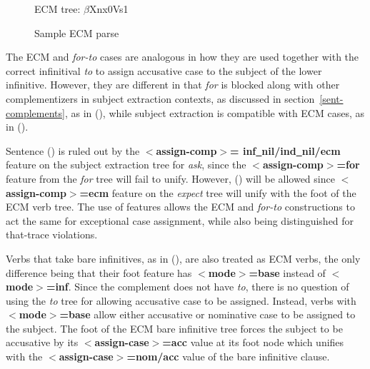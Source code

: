 \begin{figure}[hbt]
\centering
\hspace{0.0in}
\caption{ECM tree: $\beta$Xnx0Vs1}
\label{expects-decl}
\label{3;1,15}
\end{figure}

\begin{figure}[hbt]
\centering
\hspace{0.0in}
\caption{Sample ECM parse}
\label{van-expects}
\end{figure}

The ECM and {\it for-to\/} cases are analogous in how they are used together
with the correct infinitival {\it to} to assign accusative case to the 
subject of the lower infinitive.  However, they are different in that
{\it for} is blocked along with other complementizers in subject extraction
contexts, as discussed in section~\ref{sent-complements}, as in
(), while subject extraction is compatible with ECM cases, 
as in ().


Sentence () is ruled out by the {\bf $<$assign-comp$>$=
inf\underline{~}nil/ind\underline{~}nil/ecm} feature
on the subject extraction tree for {\it ask}, since the
{\bf $<$assign-comp$>$=for} feature from the {\it for} tree will fail to 
unify.  However, 
() will be allowed since {\bf $<$assign-comp$>$=ecm} feature on the
{\it expect} tree will unify with the foot of the ECM verb tree.  
The use of features allows the ECM and
{\it for-to\/} constructions to act the same for exceptional case assignment,
while also being distinguished for that-trace violations.

Verbs that take bare infinitives, as in (), are also treated as ECM
verbs, the only difference being that their foot feature has {\bf
$<$mode$>$=base} instead of {\bf $<$mode$>$=inf}.  Since the complement does
not have {\it to}, there is no question of using the {\it to} tree for allowing
accusative case to be assigned.  Instead, verbs with {\bf $<$mode$>$=base}
allow either accusative or nominative case to be assigned to the subject. The
foot of the ECM bare infinitive tree forces the subject to be accusative by its
{\bf $<$assign-case$>$=acc} value at its foot node which unifies with the {\bf
$<$assign-case$>$=nom/acc} value of the bare infinitive clause.

